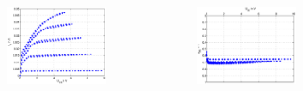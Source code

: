 \begin{frame}
\begin{columns}[c]
\begin{figure}[H]
\begin{center}
         \end{center}
         \end{figure}
         \begin{figure}[H]
         \begin{center}
                 \includegraphics[scale=0.3]{./img/bode/Aufgabe_1_doublestair_IC_UC.eps}
         \end{center}
         \end{figure}
         \begin{figure}[H]
         \begin{center}
                 \includegraphics[scale=0.3]{./img/bode/Aufgabe_1_doublestair_UB_UC.eps}
         \end{center}
         \end{figure}
    \end{columns}
\end{frame}

